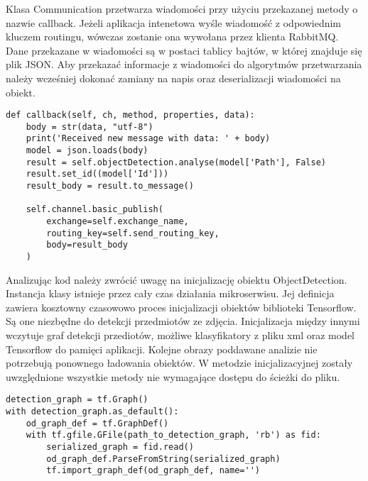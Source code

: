 \begin{itemize}
Klasa Communication przetwarza wiadomości przy użyciu przekazanej metody o nazwie callback. Jeżeli aplikacja intenetowa wyśle wiadomość z odpowiednim kluczem routingu, wówczas zostanie ona wywołana przez klienta RabbitMQ. Dane przekazane w wiadomości są w postaci tablicy bajtów, w której znajduje się plik JSON. Aby przekazać informacje z wiadomości do algorytmów przetwarzania należy wcześniej dokonać zamiany na napis oraz deserializacji wiadomości na obiekt.



\begin{lstlisting}[caption={Odbieranie wiadomości w środowisku Python.}]
def callback(self, ch, method, properties, data):
	body = str(data, "utf-8")
	print('Received new message with data: ' + body)
	model = json.loads(body)
	result = self.objectDetection.analyse(model['Path'], False)
	result.set_id((model['Id']))
	result_body = result.to_message()
	
	self.channel.basic_publish(
		exchange=self.exchange_name,
		routing_key=self.send_routing_key,
		body=result_body
	)
\end{lstlisting}

Analizując kod należy zwrócić uwagę na inicjalizację obiektu ObjectDetection. Instancja klasy istnieje przez cały czas działania mikroserwisu. Jej definicja zawiera kosztowny czasowowo proces inicjalizacji obiektów biblioteki Tensorflow. Są one niezbędne do detekcji przedmiotów ze zdjęcia. Inicjalizacja między innymi wczytuje graf detekcji przediotów, możliwe klasyfikatory z pliku xml oraz model Tensorflow do pamięci aplikacji. Kolejne obrazy poddawane analizie nie potrzebują ponownego ładowania obiektów. W metodzie inicjalizacyjnej zostały uwzględnione wszystkie metody nie wymagające dostępu do ścieżki do pliku.
\newline
\begin{lstlisting}[caption={Fragment inicjalizacji obiektów biblioteki Tensorflow.}]
detection_graph = tf.Graph()
with detection_graph.as_default():
	od_graph_def = tf.GraphDef()
	with tf.gfile.GFile(path_to_detection_graph, 'rb') as fid:
		serialized_graph = fid.read()
		od_graph_def.ParseFromString(serialized_graph)
		tf.import_graph_def(od_graph_def, name='')
	

\end{lstlisting}
\end{itemize}
